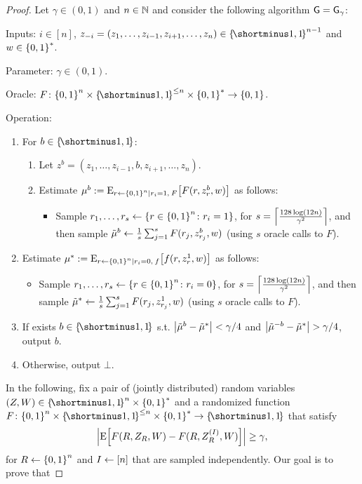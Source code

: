\begin{lemma}
    \PredictionLemma
\end{lemma}
\begin{proof}
	
	Let $\gamma \in (0,1)$ and $n \in {\mathbb{N}}$ and consider the following algorithm $\mathsf{G} = \mathsf{G}_{\gamma}$:
	\begin{algorithm}
		\item Inputs: $i \in [n]$,  $z_{-i} = (z_1,\ldots,z_{i-1},z_{i+1},\ldots,z_n) \in \oo^{n-1}$ and $w \in \zo^*$.
		\item Parameter: $\gamma \in (0,1)$.
		\item Oracle: $F \colon \zo^n \times \oo^{\leq n} \times \zo^* \rightarrow \zo$.
		\item Operation:~
		\begin{enumerate}
			\item For $b \in \oo$:
			\begin{enumerate}
				\item Let $z^b = (z_1,\ldots,z_{i-1},b,z_{i+1},\ldots,z_n)$.
				\item Estimate $\mu^b \eqdef \eex{r \la \zo^n \mid r_i = 1, \: F}{F(r,z^b_{r}, w)}$ as follows:
				\begin{itemize}
					\item Sample $r_1,\ldots,r_{s} \la \set{r \in \zo^n \colon r_i = 1}$, for $s = \ceil{\frac{128 \log (12n)}{\gamma^2}}$, and then sample $\tilde{\mu}^b \gets \frac1{s} \sum_{j=1}^s F(r_j,z^b_{r_j}, w)$ (using $s$ oracle calls to $F$).
				\end{itemize}
			\end{enumerate}
			\item Estimate $\mu^* \eqdef \eex{r \la \zo^n \mid r_i = 0, \: f}{f(r,z^1_{r}, w)}$ as follows:
			\begin{itemize}
				\item Sample $r_1,\ldots,r_{s}  \la \set{r \in \zo^n \colon r_i = 0}$, for $s = \ceil{\frac{128 \log (12n)}{\gamma^2}}$, and then sample $\tilde{\mu}^* \gets \frac1{s} \sum_{j=1}^s F(r_j,z^1_{r_j}, w)$ (using $s$ oracle calls to $F$).
			\end{itemize}
			\item If exists $b \in \oo$ s.t. $\size{\tilde{\mu}^b - \tilde{\mu}^*} < \gamma/4$ and $\size{\tilde{\mu}^{-b} - \tilde{\mu}^*} > \gamma/4$, output $b$.
			\item Otherwise, output $\bot$.
		\end{enumerate}
	\end{algorithm}
	In the following, fix a pair of (jointly distributed) random variables $(Z,W) \in \oo^n \times \zo^*$ and a randomized function  $F \colon \zo^n \times \oo^{\leq n} \times \zo^* \rightarrow \oo$ that satisfy 
	\begin{align*}
		\size{\ex{F(R,Z_{R},W) - F(R,Z^{(I)}_{R},W)}} \geq \gamma,
	\end{align*}
	for $R \la \zo^n$ and $I \gets [n]$ that are sampled independently. 
	Our goal is to prove that 
	

\end{proof}
